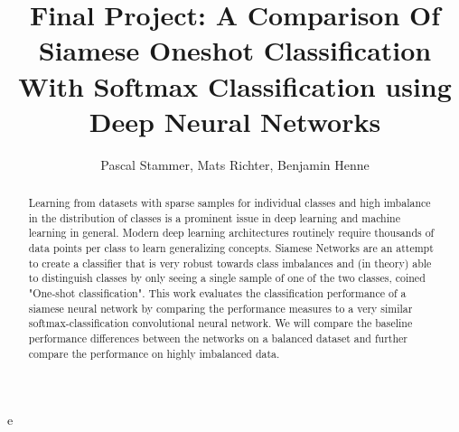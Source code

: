 ﻿\documentclass[a4paper,pt12]{article}
\begin{document}
\author{Pascal Stammer, Mats Richter, Benjamin Henne}
\title{Final Project: A Comparison Of Siamese Oneshot Classification With Softmax Classification using Deep Neural Networks}

\maketitle

\begin{abstract}
Learning from datasets with sparse samples for individual classes and high imbalance in the distribution of classes is a prominent issue in deep learning and machine learning in general. Modern deep learning architectures routinely require thousands of data points per class to learn generalizing concepts. Siamese Networks are an attempt to create a classifier that is very robust towards class imbalances and (in theory) able to distinguish classes by only seeing a single sample of one of the two classes, coined "One-shot classification". This work evaluates the classiﬁcation performance of a siamese neural network by comparing the performance measures to a very similar softmax-classiﬁcation convolutional neural network. We will compare the baseline performance diﬀerences between the networks on a balanced dataset and further compare the performance on highly imbalanced data.

\end{abstract}e
\end{document}
